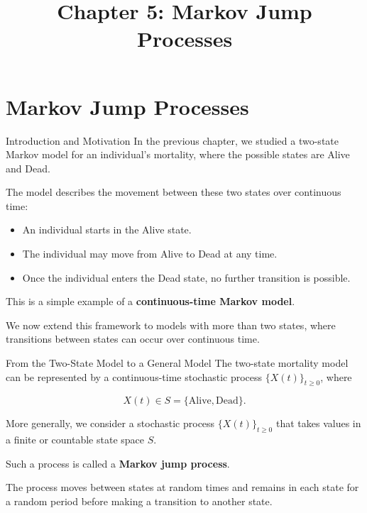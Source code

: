 \documentclass[
  ignorenonframetext,
  aspectratio=169,
]{beamer}
\title{\texorpdfstring{Chapter 5: Markov Jump
Processes}{Chapter 5: Markov Jump Processes}}
\author{}
\date{}
\providecommand{\tightlist}{%
  \setlength{\itemsep}{0pt}\setlength{\parskip}{0pt}}
\begin{document}
\frame{\titlepage}


\section{Markov Jump Processes}\label{markov-jump-processes}

\begin{frame}{Introduction and Motivation}
\protect{}\label{introduction-and-motivation}
In the previous chapter, we studied a two-state Markov model for an
individual's mortality, where the possible states are Alive and Dead.

The model describes the movement between these two states over
continuous time:

\begin{itemize}
\tightlist
\item
  An individual starts in the Alive state.
\item
  The individual may move from Alive to Dead at any time.
\item
  Once the individual enters the Dead state, no further transition is
  possible.
\end{itemize}

This is a simple example of a \textbf{continuous-time Markov model}.

We now extend this framework to models with more than two states, where
transitions between states can occur over continuous time.
\end{frame}

\begin{frame}{From the Two-State Model to a General Model}
\protect{}\label{from-the-two-state-model-to-a-general-model}
The two-state mortality model can be represented by a continuous-time
stochastic process \(\{X(t)\}_{t\geq 0}\), where

\[
X(t)\in S=\{\text{Alive},\text{Dead}\}.
\]

More generally, we consider a stochastic process \(\{X(t)\}_{t\geq 0}\)
that takes values in a finite or countable state space \(S\).

Such a process is called a \textbf{Markov jump process}.

The process moves between states at random times and remains in each
state for a random period before making a transition to another state.
\end{frame}
\end{document}
